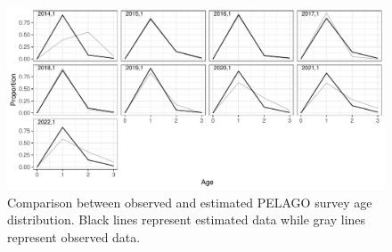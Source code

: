 \documentclass[review]{elsarticle}
\begin{document}


\begin{figure}
\centering
 \includegraphics[bb=0 0 595 360]{./pelagedist.pdf}
 \caption{ Comparison between observed and estimated PELAGO survey age distribution. Black lines represent estimated data while gray lines represent observed data.}
 \label{pelagedist}
\end{figure}



\end{document}
